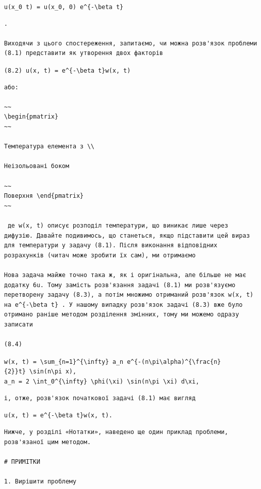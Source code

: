 \documentclass[
  ukrainian,
]{article}
\begin{document}
\texttt{u(x\_0\ t)\ =\ u(x\_0,\ 0)\ e\^{}\{-\textbackslash{}beta\ t\}}

\begin{verbatim}
.

Виходячи з цього спостереження, запитаємо, чи можна розв'язок проблеми (8.1) представити як утворення двох факторів
\end{verbatim}

\texttt{(8.2)\ u(x,\ t)\ =\ e\^{}\{-\textbackslash{}beta\ t\}w(x,\ t)}

\begin{verbatim}
або:

~~
\begin{pmatrix}
~~

Температура елемента з \\

Неізольовані боком

~~
Поверхня \end{pmatrix}
~~

 де w(x, t) описує розподіл температури, що виникає лише через дифузію. Давайте подивимось, що станеться, якщо підставити цей вираз для температури у задачу (8.1). Після виконання відповідних розрахунків (читач може зробити їх сам), ми отримаємо

Нова задача майже точно така ж, як і оригінальна, але більше не має додатку 6u. Тому замість розв'язання задачі (8.1) ми розв'язуємо перетворену задачу (8.3), а потім множимо отриманий розв'язок w(x, t) на e^{-\beta t} . У нашому випадку розв'язок задачі (8.3) вже було отримано раніше методом розділення змінних, тому ми можемо одразу записати

(8.4)
\end{verbatim}

\texttt{w(x,\ t)\ =\ \textbackslash{}sum\_\{n=1\}\^{}\{\textbackslash{}infty\}\ a\_n\ e\^{}\{-(n\textbackslash{}pi\textbackslash{}alpha)\^{}\{\textbackslash{}frac\{n\}\{2\}\}t\}\ \textbackslash{}sin(n\textbackslash{}pi\ x),}
\texttt{a\_n\ =\ 2\ \textbackslash{}int\_0\^{}\{\textbackslash{}infty\}\ \textbackslash{}phi(\textbackslash{}xi)\ \textbackslash{}sin(n\textbackslash{}pi\ \textbackslash{}xi)\ d\textbackslash{}xi,}

\begin{verbatim}
і, отже, розв'язок початкової задачі (8.1) має вигляд
\end{verbatim}

\texttt{u(x,\ t)\ =\ e\^{}\{-\textbackslash{}beta\ t\}w(x,\ t).}

\begin{verbatim}
Нижче, у розділі «Нотатки», наведено ще один приклад проблеми, розв'язаної цим методом.

# ПРИМІТКИ

1. Вирішити проблему
\end{verbatim}
\end{document}
